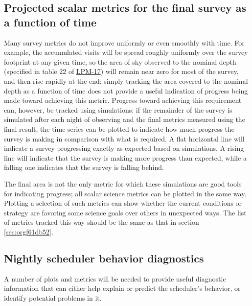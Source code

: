 \subsection{Projected scalar metrics for the final survey as a function of time}
\label{sec:org37e543f}
Many survey metrics do not improve uniformly or even smoothly with time.
For example, the accumulated visits will be spread roughly uniformly over the survey footprint at any given time, so the area of sky observed to the nominal depth (specified in table 22 of \href{http://ls.st/lpm-17}{LPM-17}) will remain near zero for most of the survey, and then rise rapidly at the end: simply tracking the area covered to the nominal depth as a function of time does not provide a useful indication of progress being made toward achieving this metric.
Progress toward achieving this requirement can, however, be tracked using simulations: if the remainder of the survey is simulated after each night of observing and the final metrics measured using the final result, the time series can be plotted to indicate how much progress the survey is making in comparison with what is required.
A flat horizontal line will indicate a survey progressing exactly as expected based on simulations.
A rising line will indicate that the survey is making more progress than expected, while a falling one indicates that the survey is falling behind.

The final area is not the only metric for which these simulations are good tools for indicating progress; all scalar science metrics can be plotted in the same way. Plotting a selection of such metrics can show whether the current conditions or strategy are favoring some science goals over others in unexpected ways.
The list of metrics tracked this way should be the same as that in section \ref{sec:orgf61db52}.

\subsection{Nightly scheduler behavior diagnostics}
\label{sec:orgf30556f}
A number of plots and metrics will be needed to provide useful diagnostic information that can either help explain or predict the scheduler's behavior, or identify potential problems in it.

